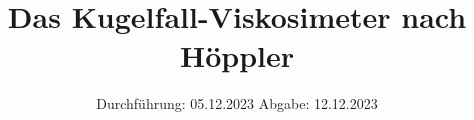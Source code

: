 

\subject{VERSUCH 207}
\title{Das Kugelfall-Viskosimeter nach Höppler}
\date{%
  Durchführung: 05.12.2023
  \hspace{3em}
  Abgabe: 12.12.2023
}



\maketitle
\thispagestyle{empty}
\tableofcontents
\newpage






\printbibliography{}


